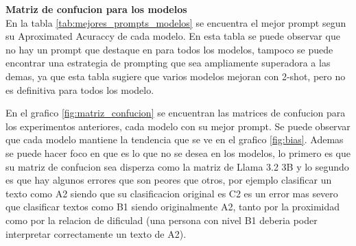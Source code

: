 \noindent\textbf{Matriz de confucion para los modelos}\\

En la tabla \ref{tab:mejores_prompts_modelos} se encuentra el mejor prompt segun su Aproximated Acuraccy de cada modelo. En esta tabla se puede observar que no hay un prompt que destaque en para todos los modelos, tampoco se puede encontrar una estrategia de prompting que sea ampliamente superadora a las demas, ya que esta tabla sugiere que varios modelos mejoran con 2-shot, pero no es definitiva para todos los modelo.

En el grafico \ref{fig:matriz_confucion} se encuentran las matrices de confucion para los experimentos anteriores, cada modelo con su mejor prompt. Se puede observar que cada modelo mantiene la tendencia que se ve en el grafico \ref{fig:bias}. Ademas se puede hacer foco en que es lo que no se desea en los modelos, lo primero es que su matriz de confucion sea disperza como la matriz de Llama 3.2 3B y lo segundo es que hay algunos errores que son peores que otros, por ejemplo clasificar un texto como A2 siendo que su clasificacion original es C2 es un error mas severo que clasificar textos como B1 siendo originalmente A2, tanto por la proximidad como por la relacion de dificulad (una persona con nivel B1 deberia poder interpretar correctamente un texto de A2).

